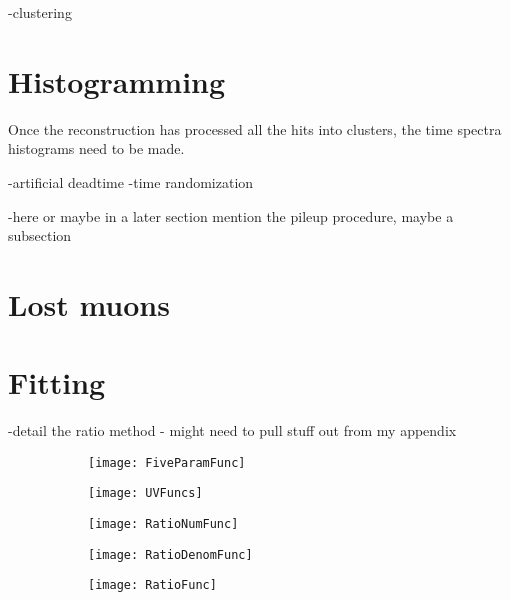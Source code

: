 -clustering




\section{Histogramming}
\label{sec:Histogramming}


Once the reconstruction has processed all the hits into clusters, the time spectra histograms need to be made.



-artificial deadtime
-time randomization

-here or maybe in a later section mention the pileup procedure, maybe a subsection


\section{Lost muons}
\label{sec:lostmuons}




\section{Fitting}
\label{sec:Fitting}


-detail the ratio method - might need to pull stuff out from my appendix


    \begin{figure}[]
    \centering
        \begin{subfigure}[t]{0.45\textwidth}
            \centering
            \texttt{[image: FiveParamFunc]}
            \caption{}
        \end{subfigure}%

        \vspace{2mm}
        \begin{subfigure}[t]{0.45\textwidth}
            \centering
            \texttt{[image: UVFuncs]}
            \caption{}
        \end{subfigure}
        \begin{subfigure}[t]{0.45\textwidth}
            \centering
            \texttt{[image: RatioNumFunc]}
            \caption{}
        \end{subfigure}%
        \vspace{2mm}
        \begin{subfigure}[t]{0.45\textwidth}
            \centering
            \texttt{[image: RatioDenomFunc]}
            \caption{}
        \end{subfigure}
        \begin{subfigure}[t]{0.45\textwidth}
            \centering
            \texttt{[image: RatioFunc]}
            \caption{}
        \end{subfigure}%
    \caption[]{}
    \label{}
    \end{figure}






